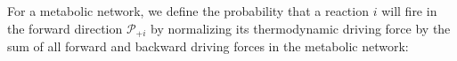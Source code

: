 For a metabolic network, we define the probability that a reaction $i$ will fire in the forward direction ${\mathcal P_{+i}}$ by normalizing its thermodynamic driving force by the sum of all forward and backward driving forces in the metabolic network:
